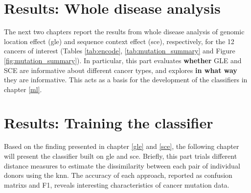 \documentclass[12pt,a4paper, twoside,]{report}
\begin{document}






\newpage

{
  \hypersetup{linkcolor=CadetBlue}
  \tableofcontents
}
\newpage
\label{glossary}
\printglossary
\newpage



\newpage

\part{Results: Whole disease analysis}{
    The next two chapters report the results from whole disease analysis of genomic location effect (\gls{gle}) and sequence context effect (\gls{sce}), respectively, for the 12 cancers of interest (Tables \ref{tab:encode}, \ref{tab:mutation_summary} and Figure \ref{fig:mutation_summary}). In particular, this part evaluates \textbf{whether} GLE and SCE are informative about different cancer types, and explores \textbf{in what way} they are informative. This acts as a basis for the development of the \glspl{classifier} in chapter \ref{ml}.}




\part{Results: Training the classifier}{
    Based on the finding presented in chapter \ref{gle} and \ref{sce}, the following chapter will present the \gls{classifier} built on \gls{gle} and \gls{sce}. Briefly, this part trials different distance measures to estimate the dissimilarity between each pair of individual donors using the \gls{knn}. The accuracy of each approach, reported as \glspl{confusion matrix} and F1, reveals interesting characteristics of cancer mutation data.}











\end{document}
